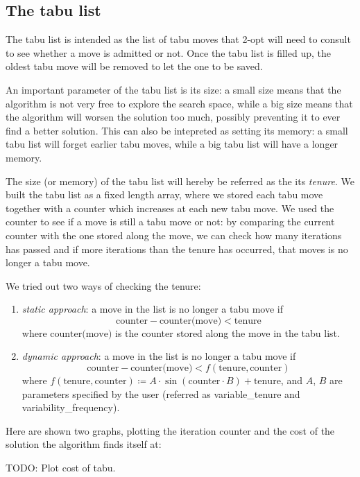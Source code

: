 \subsection{The tabu list}

The tabu list is intended as the list of tabu moves that 2-opt will need to consult to see whether a move is admitted or not. Once the tabu list is filled up, the oldest tabu move will be removed to let the one to be saved.

An important parameter of the tabu list is its size: a small size means that the algorithm is not very free to explore the search space, while a big size means that the algorithm will worsen the solution too much, possibly preventing it to ever find a better solution. This can also be intepreted as setting its memory: a small tabu list will forget earlier tabu moves, while a big tabu list will have a longer memory.

The size (or memory) of the tabu list will hereby be referred as the its \textit{tenure}. We built the tabu list as a fixed length array, where we stored each tabu move together with a counter which increases at each new tabu move. We used the counter to see if a move is still a tabu move or not: by comparing the current counter with the one stored along the move, we can check how many iterations has passed and if more iterations than the tenure has occurred, that moves is no longer a tabu move.

We tried out two ways of checking the tenure:

\begin{enumerate}
    \item \textit{static approach}: a move in the list is no longer a tabu move if
    $$\text{counter}-\text{counter(move)} < \text{tenure}$$
    where $\text{counter(move)}$ is the counter stored along the move in the tabu list.
    \item \textit{dynamic approach}: a move in the list is no longer a tabu move if
    $$\text{counter}-\text{counter(move)} < f(\text{tenure}, \text{counter})$$
    where $f(\text{tenure},\text{counter})\coloneq A\cdot\sin(\text{counter}\cdot B) + \text{tenure}$, and $A$, $B$ are parameters specified by the user (referred as variable\_tenure and variability\_frequency).
\end{enumerate}

Here are shown two graphs, plotting the iteration counter and the cost of the solution the algorithm finds itself at:

TODO: Plot cost of tabu.

